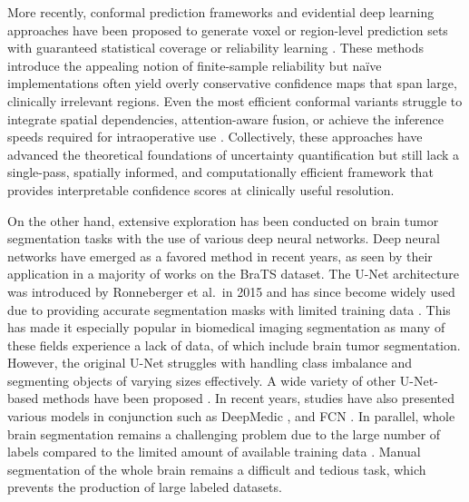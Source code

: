 \documentclass[11pt,letterpaper]{article}
\begin{document}
More recently, conformal prediction frameworks and evidential deep learning approaches have been proposed to generate voxel or region-level prediction sets with guaranteed statistical coverage or reliability learning \cite{li2023region,huang2024deep}. These methods introduce the appealing notion of finite-sample reliability but naïve implementations often yield overly conservative confidence maps that span large, clinically irrelevant regions. Even the most efficient conformal variants struggle to integrate spatial dependencies, attention-aware fusion, or achieve the inference speeds required for intraoperative use \cite{zhou2023uncertainty,yang2024spu}. Collectively, these approaches have advanced the theoretical foundations of uncertainty quantification but still lack a single-pass, spatially informed, and computationally efficient framework that provides interpretable confidence scores at clinically useful resolution.

On the other hand, extensive exploration has been conducted on brain tumor segmentation tasks with the use of various deep neural networks. Deep neural networks have emerged as a favored method in recent years, as seen by their application in a majority of works on the BraTS dataset. The U-Net architecture \cite{ronneberger2015} was introduced by Ronneberger et al.\ in 2015 and has since become widely used due to providing accurate segmentation masks with limited training data \cite{zhou2024metastasis}. This has made it especially popular in biomedical imaging segmentation as many of these fields experience a lack of data, of which include brain tumor segmentation. However, the original U-Net struggles with handling class imbalance and segmenting objects of varying sizes effectively. A wide variety of other U-Net-based methods have been proposed \cite{zheng2022,hechri2024}.
In recent years, studies have also presented various models in conjunction such as DeepMedic \cite{kamnitsas2016}, and FCN \cite{long2015}. In parallel, whole brain segmentation remains a challenging problem due to the large number of labels compared to the limited amount of available training data \cite{fischl2012}. Manual segmentation of the whole brain remains a difficult and tedious task, which prevents the production of large labeled datasets.
\end{document}
